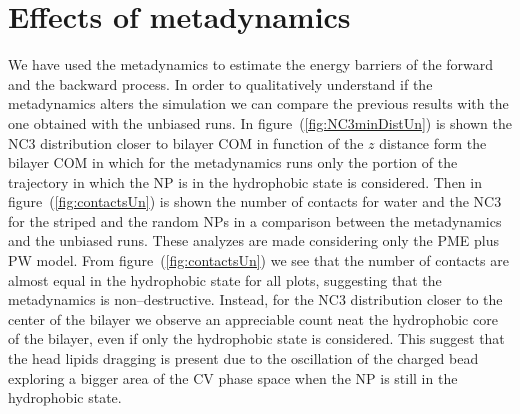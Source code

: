 \section{Effects of metadynamics}
We have used the metadynamics to estimate the energy barriers of the forward and the backward process. In order to qualitatively understand if the metadynamics alters the simulation we can compare the previous results with the one obtained with the unbiased runs. In figure~(\ref{fig:NC3minDistUn}) is shown the NC$3$ distribution closer to bilayer \ac{COM} in function of the $z$ distance form the bilayer \ac{COM} in which for the metadynamics runs only the portion of the trajectory in which the \ac{NP} is in the hydrophobic state is considered. Then in figure~(\ref{fig:contactsUn}) is shown the number of contacts for water and the NC$3$ for the striped and the random \acp{NP} in a comparison between the metadynamics and the unbiased runs. These analyzes are made considering only the \ac{PME} plus \ac{PW} model. From figure~(\ref{fig:contactsUn}) we see that the number of contacts are almost equal in the hydrophobic state for all plots, suggesting that the metadynamics is non--destructive. Instead, for the NC$3$ distribution closer to the center of the bilayer we observe an appreciable count neat the hydrophobic core of the bilayer, even if only the hydrophobic state is considered. This suggest that the head lipids dragging is present due to the oscillation of the charged bead exploring a bigger area of the \ac{CV} phase space when the \ac{NP} is still in the hydrophobic state.
